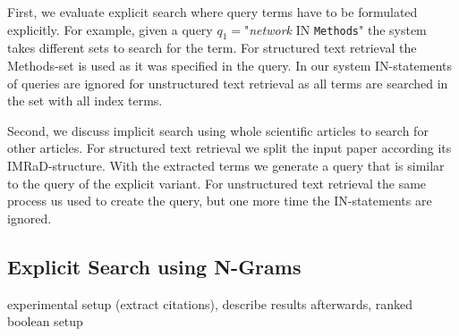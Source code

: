First, we evaluate explicit search where query terms have to be formulated explicitly. For example, given a query $q_1=$"\textit{network} IN \texttt{Methods}" the system takes different sets to search for the term. For structured text retrieval the Methods-set is used as it was specified in the query. In our system IN-statements of queries are ignored for unstructured text retrieval as all terms are searched in the set with all index terms.

Second, we discuss implicit search using whole scientific articles to search for other articles. For structured text retrieval we split the input paper according its IMRaD-structure. With the extracted terms we generate a query that is similar to the query of the explicit variant. For unstructured text retrieval the same process us used to create the query, but one more time the IN-statements are ignored.

\subsection{Explicit Search using N-Grams}

experimental setup (extract citations), describe results afterwards, ranked boolean setup

